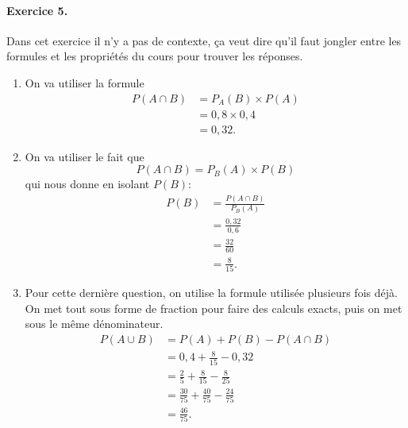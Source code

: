 \documentclass[11pt]{article}
\begin{document}
\paragraph{Exercice 5.} Dans cet exercice il n'y a pas de contexte, ça veut dire
qu'il faut jongler entre les formules et les propriétés du cours pour trouver
les réponses.
\begin{enumerate}
  \item On va utiliser la formule
    \begin{align*}
      P(A\cap B) &= P_A(B)\times P(A) \\
      &= 0,8\times0,4 \\
      &= 0,32.
    \end{align*}
  \item On va utiliser le fait que
    \[
      P(A\cap B)=P_B(A)\times P(B)
    \]
    qui nous donne en isolant $P(B)$:
    \begin{align*}
      P(B) &= \frac{P(A\cap B)}{P_B(A)} \\
      &= \frac{0,32}{0,6} \\
      &= \frac{32}{60} \\
      &= \frac{8}{15}.
    \end{align*}
  \item Pour cette dernière question, on utilise la formule utilisée plusieurs
    fois déjà. On met tout sous forme de fraction pour faire des calculs exacts,
    puis on met sous le même dénominateur.
    \begin{align*}
      P(A\cup B) &= P(A)+P(B)-P(A\cap B) \\
      &= 0,4 + \frac{8}{15}-0,32 \\
      &= \frac{2}{5}+\frac{8}{15}-\frac{8}{25} \\
      &= \frac{30}{75}+\frac{40}{75}-\frac{24}{75} \\
      &= \frac{46}{75}.
    \end{align*}
\end{enumerate}
\end{document}
